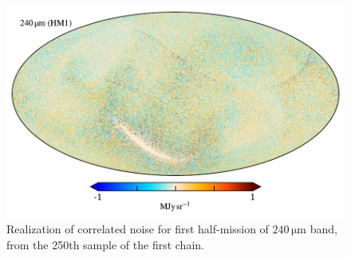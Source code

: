\documentclass{aa}
\begin{document}
\begin{figure}
	\centering
	\includegraphics[width=\linewidth]{figs/ncorr_240a.pdf}
	\caption{Realization of correlated noise for first half-mission of $240\,\mathrm{\mu m}$ band, from the 250th sample of the first chain.}
  \label{fig:ncorr_map}
\end{figure}
\end{document}
